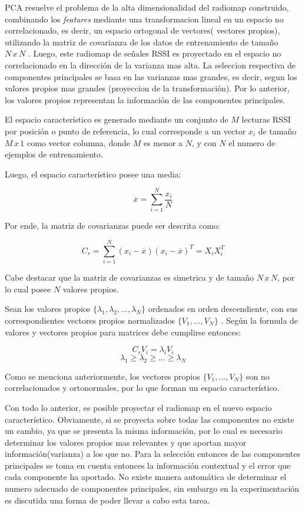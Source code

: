 PCA resuelve el problema de la alta dimensionalidad del radiomap construido, combinando los \textit{features} mediante una transformacion lineal en un espacio no correlacionado, es decir, un espacio ortogonal de vectores( vectores propios), utilizando la matriz de covarianza de los datos de entrenamiento de tamaño $ N \, x \, N$ . Luego, este radiomap de señales RSSI es proyectado en el espacio no correlacionado en la dirección de la varianza mas alta. La seleccion respectiva de componentes principales se basa en las varianzas mas grandes, es decir, segun los valores propios mas grandes (proyeccion de la transformación). Por lo anterior, los valores propios representan la información de las componentes principales.

El espacio característico es generado mediante un conjunto de $M$ lecturas RSSI por posición o punto de referencia, lo cual corresponde a un vector $x_{i}$ de tamaño $ M \, x \, 1$ como vector columna, donde $ M$ es menor a $ N$, y con $ N$ el numero de ejemplos de entrenamiento.

Luego, el espacio característico posee una media:

$$ \overline{x} = \sum_{i=1}^{N} \frac{x_{i}}{N} $$

Por ende, la matriz de covarianzas puede ser descrita como:

$$ C_{r} = \sum_{i=1}^{N} (x_{i} - \overline{x})(x_{i} - \overline{x})^T = X_{i}X_{i}^T$$

Cabe destacar que la matriz de covarianzas es simetrica y de tamaño $N \, x \, N$, por lo cual posee $N$ valores propios.

Sean los valores propios $ \{ \lambda_{1}, \lambda_{2}, ..., \lambda_{N} \} $ ordenados en orden descendiente, con sus correspondientes vectores propios normalizados $ \{ V_{1}, ... , V_{N} \} $ . Según la formula de valores y vectores propios para matrices debe cumplirse entonces:

$$ C_{r} V_{i} =  \lambda_{i} V_{i}$$
$$ \lambda_{1} \geq \lambda_{2} \geq ... \geq \lambda_{N}$$

Como se menciona anteriormente, los vectores propios $ \{ V_{1}, ... , V_{N} \} $ son no correlacionados y ortonormales, por lo que forman un espacio característico.

Con todo lo anterior, es posible proyectar el radiomap en el nuevo espacio característico. Obviamente, si se proyecta sobre todas las componentes no existe un cambio, ya que se presenta la misma información, por lo cual es necesario determinar los valores propios mas relevantes y que aportan mayor información(varianza) a los que no. Para la selección entonces de las componentes principales se toma en cuenta entonces la información contextual y el error que cada componente ha aportado. No existe manera automática de determinar el numero adecuado de componentes principales, sin embargo en la experimentación es discutida una forma de poder llevar a cabo esta tarea. 

